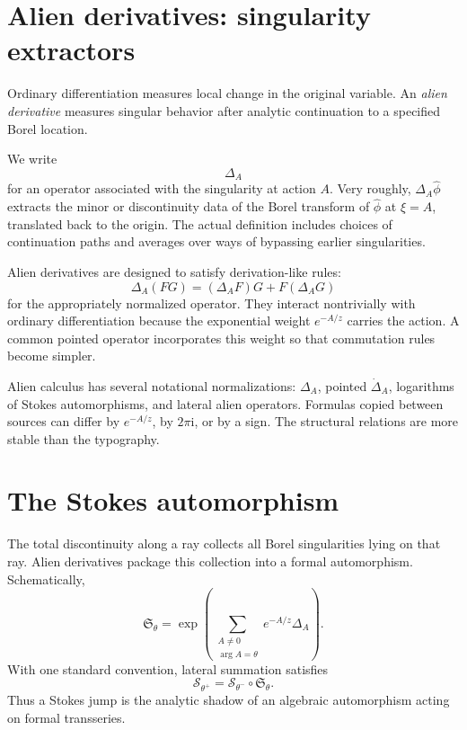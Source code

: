 \documentclass[11pt,openany]{book}
\theoremstyle{definition}
\theoremstyle{plain}
\theoremstyle{remark}
\newcommand{\ii}{\mathrm{i}}
\newcommand{\trans}[1]{\widehat{#1}}
\newcommand{\Stokes}{\mathfrak{S}}
\newcommand{\alien}{\Delta}
\newcommand{\lateralsum}[1]{\mathcal{S}_{#1}}
\begin{document}
\section{Alien derivatives: singularity extractors}

Ordinary differentiation measures local change in the original variable. An \emph{alien derivative} measures singular behavior after analytic continuation to a specified Borel location.

We write
\[
 \alien_A
\]
for an operator associated with the singularity at action $A$. Very roughly, $\alien_A\trans\phi$ extracts the minor or discontinuity data of the Borel transform of $\trans\phi$ at $\xi=A$, translated back to the origin. The actual definition includes choices of continuation paths and averages over ways of bypassing earlier singularities.

Alien derivatives are designed to satisfy derivation-like rules:
\begin{equation}\label{eq:alien-leibniz}
 \alien_A(FG)=(\alien_AF)G+F(\alien_AG)
\end{equation}
for the appropriately normalized operator. They interact nontrivially with ordinary differentiation because the exponential weight $e^{-A/z}$ carries the action. A common pointed operator incorporates this weight so that commutation rules become simpler.

\begin{warningbox}
Alien calculus has several notational normalizations: $\Delta_A$, pointed $\dot\Delta_A$, logarithms of Stokes automorphisms, and lateral alien operators. Formulas copied between sources can differ by $e^{-A/z}$, by $2\pi\ii$, or by a sign. The structural relations are more stable than the typography.
\end{warningbox}

\section{The Stokes automorphism}

The total discontinuity along a ray collects all Borel singularities lying on that ray. Alien derivatives package this collection into a formal automorphism. Schematically,
\begin{equation}\label{eq:stokes-automorphism-schematic}
 \Stokes_\theta
 =\exp\left(
   \sum_{\substack{A\ne0\\\arg A=\theta}}
   e^{-A/z}\alien_A
 \right).
\end{equation}
With one standard convention, lateral summation satisfies
\begin{equation}\label{eq:lateral-stokes-relation}
 \lateralsum{\theta^+}
 =\lateralsum{\theta^-}\circ\Stokes_\theta.
\end{equation}
Thus a Stokes jump is the analytic shadow of an algebraic automorphism acting on formal transseries.
\end{document}

